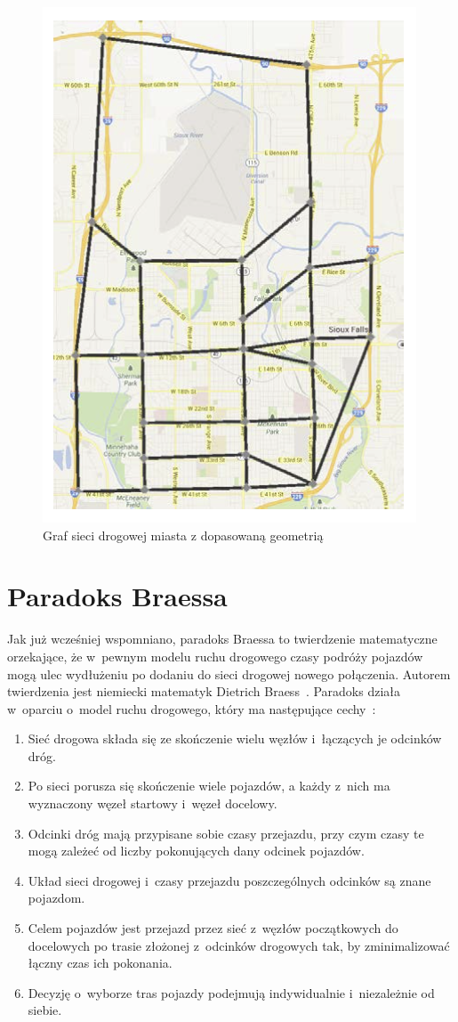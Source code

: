 \documentclass[twoside,12pt]{report}
\begin{document}
\begin{figure}[htbp]
	\centering
	\includegraphics[width=0.4\linewidth]{img/dopasowanie}
	\caption{Graf sieci drogowej miasta z dopasowaną geometrią}
	\label{fig:siouxfalls_ex_graf_geometry}
\end{figure}

\section{Paradoks Braessa}

Jak już wcześniej wspomniano, paradoks Braessa to twierdzenie matematyczne orzekające, że w~pewnym modelu ruchu drogowego czasy podróży pojazdów mogą ulec wydłużeniu po dodaniu do sieci drogowej nowego połączenia. Autorem twierdzenia jest niemiecki matematyk Dietrich Braess~\cite{braess}. Paradoks działa w~oparciu o~model ruchu drogowego, który ma następujące cechy~\cite{paradox}:

\begin{enumerate}
\item Sieć drogowa składa się ze skończenie wielu węzłów i~łączących je odcinków dróg.
\item Po sieci porusza się skończenie wiele pojazdów, a każdy z~nich ma wyznaczony węzeł startowy i~węzeł docelowy.
\item Odcinki dróg mają przypisane sobie czasy przejazdu, przy czym czasy te mogą zależeć od liczby pokonujących dany odcinek pojazdów.
\item Układ sieci drogowej i~czasy przejazdu poszczególnych odcinków są znane pojazdom.
\item Celem pojazdów jest przejazd przez sieć z~węzłów początkowych do docelowych po trasie złożonej z~odcinków drogowych tak, by zminimalizować łączny czas ich pokonania.
\item Decyzję o~wyborze tras pojazdy podejmują indywidualnie i~niezależnie od siebie.
\end{enumerate}
\end{document}
